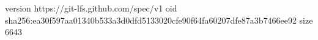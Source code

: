 version https://git-lfs.github.com/spec/v1
oid sha256:ea30f597aa01340b533a3d0dfd5133020cfe90f64fa60207dfe87a3b7466ee92
size 6643
